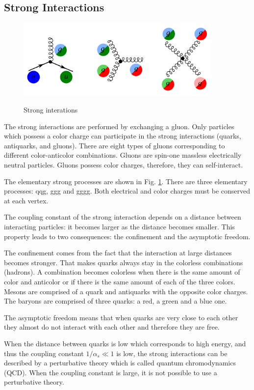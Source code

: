 \subsection{Strong Interactions}
\label{sec:Intro_QCD}

\begin{figure}[htb]
  \begin{center}
    {\includegraphics[width=0.90\textwidth]{../figs/Intro/feynmStrong.png}}
    \caption{Strong interations}
    \label{fig:feynmStrong}
  \end{center}
\end{figure}

The strong interactions are performed by exchanging a gluon. Only particles which possess a color charge can participate in the strong interactions (quarks, antiquarks, and gluons). There are eight types of gluons corresponding to different color-anticolor combinations. Gluons are spin-one massless electrically neutral particles. Gluons possess color charges, therefore, they can self-interact. 

The elementary strong processes are shown in Fig. \ref{fig:feynmStrong}. There are three elementary processes: qqg, ggg and gggg. Both electrical and color charges must be conserved at each vertex.

The coupling constant of the strong interaction depends on a distance between interacting particles: it becomes larger as the distance becomes smaller. This property leads to two consequences: the confinement and the asymptotic freedom.

The confinement comes from the fact that the interaction at large distances becomes stronger. That makes quarks always stay in the colorless combinations (hadrons). A combination becomes colorless when there is the same amount of color and anticolor or if there is the same amount of each of the three colors.  Mesons are comprised of a quark and antiquarks with the opposite color charges. The baryons are comprised of three quarks: a red, a green and a blue one.

The asymptotic freedom means that when quarks are very close to each other they almost do not interact with each other and therefore they are free. 

When the distance between quarks is low which corresponds to high energy, and thus the coupling constant $1/\alpha_s \ll 1$ is low, the strong interactions can be described by a perturbative theory which is called quantum chromodynamics (QCD). When the coupling constant is large, it is not possible to use a perturbative theory. 
